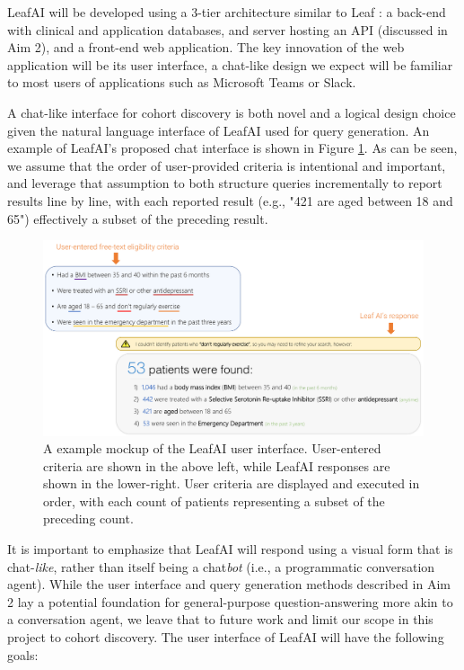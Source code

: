 \documentclass[../main.tex]{subfiles}
\begin{document}
LeafAI will be developed using a 3-tier architecture similar to Leaf \cite{dobbins2019leaf}: a back-end with clinical and application databases, and server hosting an API (discussed in Aim 2), and a front-end web application. The key innovation of the web application will be its user interface, a chat-like design we expect will be familiar to most users of applications such as Microsoft Teams or Slack.

A chat-like interface for cohort discovery is both novel and a logical design choice given the natural language interface of LeafAI used for query generation. An example of LeafAI's proposed chat interface is shown in Figure \ref{fig_leafai_demo}. As can be seen, we assume that the order of user-provided criteria is intentional and important, and leverage that assumption to both structure queries incrementally to report results line by line, with each reported result (e.g., "421 are aged between 18 and 65") effectively a subset of the preceding result.

\begin{figure}[h!]
  \includegraphics[scale=0.58]{Figures/8_web_application/leafai_demo.pdf}  
  \caption{A example mockup of the LeafAI user interface. User-entered criteria are shown in the above left, while LeafAI responses are shown in the lower-right. User criteria are displayed and executed in order, with each count of patients representing a subset of the preceding count.}
\label{fig_leafai_demo}
\end{figure}

It is important to emphasize that LeafAI will respond using a visual form that is chat-\textit{like}, rather than itself being a chat\textit{bot} (i.e., a programmatic conversation agent). While the user interface and query generation methods described in Aim 2 lay a potential foundation for general-purpose question-answering more akin to a conversation agent, we leave that to future work and limit our scope in this project to cohort discovery. The user interface of LeafAI will have the following goals:
\end{document}
